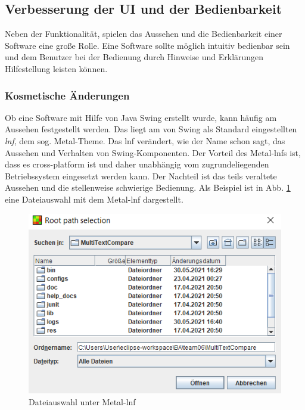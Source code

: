 \subsection{Verbesserung der UI und der Bedienbarkeit}

Neben der Funktionalität, spielen das Aussehen und die Bedienbarkeit einer Software eine große Rolle. Eine Software sollte möglich intuitiv bedienbar sein und dem Benutzer bei der Bedienung durch Hinweise und Erklärungen Hilfestellung leisten können. 

\subsubsection{Kosmetische Änderungen}
Ob eine Software mit Hilfe von Java Swing erstellt wurde, kann häufig am Aussehen festgestellt werden. Das liegt am von Swing als Standard eingestellten \emph{\acrfull{lnf}}, dem sog. \glqq Metal\grqq{}-Theme. Das \acrshort{lnf} verändert, wie der Name schon sagt, das Aussehen und Verhalten von Swing-Komponenten. Der Vorteil des Metal-\acrshort{lnf}s ist, dass es cross-platform ist und daher unabhängig vom zugrundeliegenden Betriebssystem eingesetzt werden kann. Der Nachteil ist das teils veraltete Aussehen und die stellenweise schwierige Bedienung. Als Beispiel ist in Abb. \ref{fig:metalFileSelection} eine Dateiauswahl mit dem Metal-\acrshort{lnf} dargestellt. 

\begin{figure}
    \centering
    \includegraphics[]{images/metalFileSelection.png}
    \caption{Dateiauswahl unter Metal-\acrshort{lnf}}
    \label{fig:metalFileSelection}
\end{figure}

